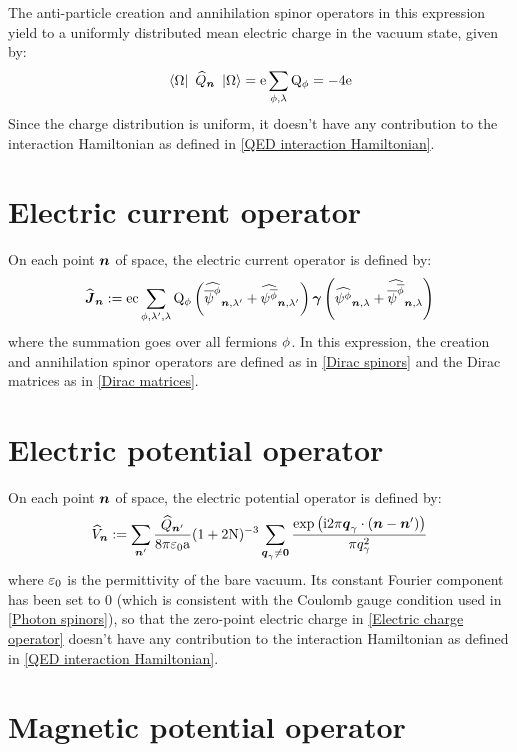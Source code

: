 \documentclass[10pt,a4paper,twoside,openany]{book}
\begin{document}
The anti-particle creation and annihilation spinor operators in this expression yield to a uniformly distributed mean electric charge in the vacuum state, given by:
\begin{equation*}
\left\langle{\Omega}\right|\  \widehat{Q}_{\boldsymbol{n}} \ \left|{\Omega}\right\rangle = \mathrm e \sum_{\phi,\lambda} \mathrm Q_{\phi} = - 4 \mathrm e
\end{equation*}
Since the charge distribution is uniform, it doesn't have any contribution to the interaction Hamiltonian as defined in \ref{QED interaction Hamiltonian}.

\section{Electric current operator}

On each point $\boldsymbol{n}$ of space, the electric current operator is defined by:
\begin{equation*}
\widehat{\boldsymbol{J}}_{\boldsymbol{n}} := \mathrm e \mathrm c \sum_{\phi,\lambda',\lambda} \mathrm Q_{\phi} \left( \widehat{\overline \psi^{\phi}}_{{\boldsymbol{n}}, {\lambda'}} + \widehat{\psi^{\overline{\phi}}}_{{\boldsymbol{n}}, {\lambda'}} \right) \boldsymbol{\gamma} \left( \widehat{\psi^{\phi}}_{{\boldsymbol{n}}, {\lambda}} + \widehat{\overline \psi^{\overline{\phi}}}_{{\boldsymbol{n}}, {\lambda}} \right)
\end{equation*}
where the summation goes over all fermions $\phi$. In this expression, the creation and annihilation spinor operators are defined as in \ref{Dirac spinors} and the Dirac matrices as in \ref{Dirac matrices}.

\section{Electric potential operator}

On each point $\boldsymbol{n}$ of space, the electric potential operator is defined by:
\begin{equation*}
\widehat{V}_{\boldsymbol{n}} := \sum_{\boldsymbol{n}'} \frac{\widehat{Q}_{\boldsymbol{n}'}}{8 \pi \mathrm \varepsilon_0 \mathrm a} ( 1 + 2 \mathrm N )^{-3} \sum_{\boldsymbol{q}_\gamma \neq \boldsymbol{0}} \frac{\mathrm{exp} \left( {\mathrm{i} 2 \pi \boldsymbol{q}_\gamma \cdot ( \boldsymbol{n} - \boldsymbol{n}' )} \right)}{\pi q_\gamma^2}
\end{equation*}
where $\mathrm \varepsilon_0$ is the permittivity of the bare vacuum. Its constant Fourier component has been set to $0$ (which is consistent with the Coulomb gauge condition used in \ref{Photon spinors}), so that the zero-point electric charge in \ref{Electric charge operator} doesn't have any contribution to the interaction Hamiltonian as defined in \ref{QED interaction Hamiltonian}.

\section{Magnetic potential operator}
\end{document}
